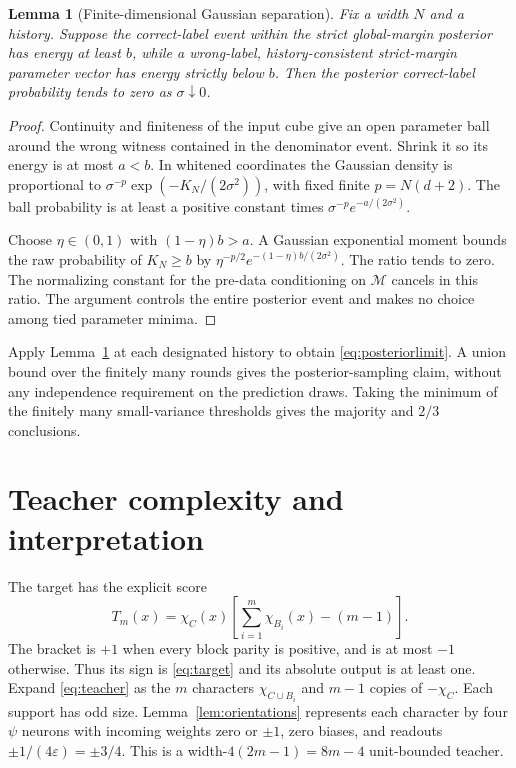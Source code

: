 \documentclass[11pt]{article}
\newtheorem{lemma}[theorem]{Lemma}
\newcommand{\eps}{\varepsilon}
\begin{document}
\begin{lemma}[Finite-dimensional Gaussian separation]\label{lem:laplace}
Fix a width $N$ and a history. Suppose the correct-label event within
the strict global-margin posterior has energy at least $b$, while a
wrong-label, history-consistent strict-margin parameter vector has
energy strictly below $b$. Then the posterior correct-label
probability tends to zero as $\sigma\downarrow0$.
\end{lemma}
\begin{proof}
Continuity and finiteness of the input cube give an open parameter
ball around the wrong witness contained in the denominator event.
Shrink it so its energy is at most $a<b$. In whitened coordinates
the Gaussian density is proportional to
$\sigma^{-p}\exp(-K_N/(2\sigma^2))$, with fixed finite
$p=N(d+2)$. The ball probability is at least a positive constant times
$\sigma^{-p}e^{-a/(2\sigma^2)}$.

Choose $\eta\in(0,1)$ with $(1-\eta)b>a$. A Gaussian exponential
moment bounds the raw probability of $K_N\ge b$ by
$\eta^{-p/2}e^{-(1-\eta)b/(2\sigma^2)}$. The ratio tends to zero.
The normalizing constant for the pre-data conditioning on
$\mathcal M$ cancels in this ratio. The argument controls the entire
posterior event and makes no choice among tied parameter minima.
\end{proof}

Apply Lemma~\ref{lem:laplace} at each designated history to obtain
\eqref{eq:posteriorlimit}. A union bound over the finitely many rounds
gives the posterior-sampling claim, without any independence
requirement on the prediction draws. Taking the minimum of the
finitely many small-variance thresholds gives the majority and
$2/3$ conclusions.

\section{Teacher complexity and interpretation}

The target has the explicit score
\begin{equation}\label{eq:teacher}
 T_m(x)=\chi_C(x)\left[\sum_{i=1}^m\chi_{B_i}(x)-(m-1)\right].
\end{equation}
The bracket is $+1$ when every block parity is positive, and is at
most $-1$ otherwise. Thus its sign is \eqref{eq:target} and its
absolute output is at least one. Expand \eqref{eq:teacher} as the
$m$ characters $\chi_{C\cup B_i}$ and $m-1$ copies of
$-\chi_C$. Each support has odd size. Lemma~\ref{lem:orientations}
represents each character by four $\psi$ neurons with incoming weights
zero or $\pm1$, zero biases, and readouts $\pm1/(4\eps)=\pm3/4$.
This is a width-$4(2m-1)=8m-4$ unit-bounded teacher.
\end{document}
